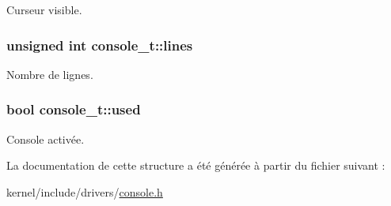 Curseur visible. \hypertarget{structconsole__t_ada36635a93afd23c3eb88c856f218103}{
\subsubsection[{lines}]{\setlength{\rightskip}{0pt plus 5cm}unsigned int console\+\_\+t\+::lines}}\label{structconsole__t_ada36635a93afd23c3eb88c856f218103}
Nombre de lignes. \hypertarget{structconsole__t_ad830edd689dced40135f6afa651677e3}{
\subsubsection[{used}]{\setlength{\rightskip}{0pt plus 5cm}bool console\+\_\+t\+::used}}\label{structconsole__t_ad830edd689dced40135f6afa651677e3}
Console activée. 

La documentation de cette structure a été générée à partir du fichier suivant \+:\begin{DoxyCompactItemize}
\item 
kernel/include/drivers/\hyperlink{console_8h}{console.\+h}\end{DoxyCompactItemize}
